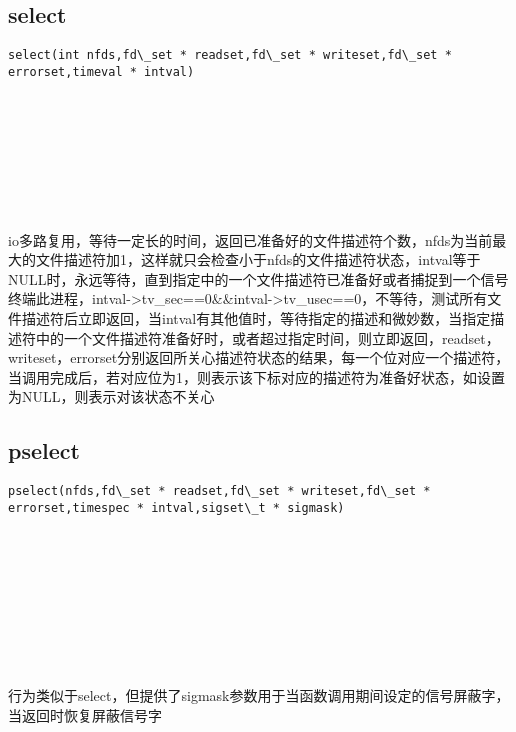 \documentclass[10pt,a4paper]{article}
\begin{document}
\subsection{select}
\begin{spacing}{2.0}
\lstset{language=C,numbers=none}
\begin{lstlisting}
select(int nfds,fd\_set * readset,fd\_set * writeset,fd\_set * errorset,timeval * intval)
\end{lstlisting}
{\large\color[rgb]{0.2,0.4,0.6}{nfds:}} \\
{\large\color[rgb]{0.2,0.4,0.6}{readset:}} \\
{\large\color[rgb]{0.2,0.4,0.6}{writeset:}} \\
{\large\color[rgb]{0.2,0.4,0.6}{errorset:}} \\
{\large\color[rgb]{0.2,0.4,0.6}{intval:}}
\paragraph{ \ \ }io多路复用，等待一定长的时间，返回已准备好的文件描述符个数，nfds为当前最大的文件描述符加1，这样就只会检查小于nfds的文件描述符状态，intval等于NULL时，永远等待，直到指定中的一个文件描述符已准备好或者捕捉到一个信号终端此进程，intval->tv\_sec==0\&\&intval->tv\_usec==0，不等待，测试所有文件描述符后立即返回，当intval有其他值时，等待指定的描述和微妙数，当指定描述符中的一个文件描述符准备好时，或者超过指定时间，则立即返回，readset，writeset，errorset分别返回所关心描述符状态的结果，每一个位对应一个描述符，当调用完成后，若对应位为1，则表示该下标对应的描述符为准备好状态，如设置为NULL，则表示对该状态不关心
\end{spacing}

\subsection{pselect}
\begin{spacing}{2.0}
\lstset{language=C,numbers=none}
\begin{lstlisting}
pselect(nfds,fd\_set * readset,fd\_set * writeset,fd\_set * errorset,timespec * intval,sigset\_t * sigmask)
\end{lstlisting}
{\large\color[rgb]{0.2,0.4,0.6}{nfds:}} \\
{\large\color[rgb]{0.2,0.4,0.6}{readset:}} \\
{\large\color[rgb]{0.2,0.4,0.6}{writeset:}} \\
{\large\color[rgb]{0.2,0.4,0.6}{errorset:}} \\
{\large\color[rgb]{0.2,0.4,0.6}{intval:}} \\
{\large\color[rgb]{0.2,0.4,0.6}{sigmask:}}
\paragraph{ \ \ }行为类似于select，但提供了sigmask参数用于当函数调用期间设定的信号屏蔽字，当返回时恢复屏蔽信号字
\end{spacing}
\end{document}
